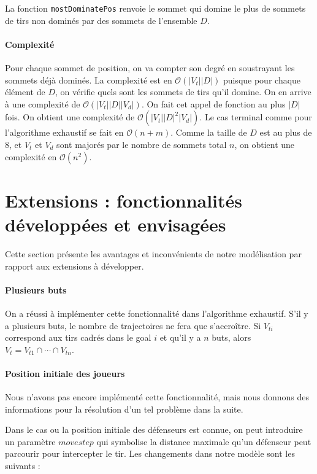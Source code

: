 \documentclass[12pt]{article}
\begin{document}
La fonction \texttt{mostDominatePos} renvoie le sommet qui domine le plus de sommets de tirs non dominés par des sommets de l'ensemble $D$.

\paragraph{Complexité} Pour chaque sommet de position, on va compter son degré en soustrayant les sommets déjà dominés. La complexité est en $\mathcal{O}(|V_t||D|)$ puisque pour chaque élément de $D$, on vérifie quels sont les sommets de tirs qu'il domine. On en arrive à une complexité de $\mathcal{O}(|V_t||D||V_d|)$. On fait cet appel de fonction au plus $|D|$ fois. On obtient une complexité de $\mathcal{O}(|V_t||D|^2|V_d|)$. Le cas terminal comme pour l'algorithme exhaustif se fait en $\mathcal{O}(n+m)$. Comme la taille de $D$ est au plus de 8, et $V_t$ et $V_d$ sont majorés par le nombre de sommets total $n$, on obtient une complexité en $\mathcal{O}(n^2)$.

\section{Extensions : fonctionnalités développées et envisagées}

Cette section présente les avantages et inconvénients de notre modélisation par rapport aux extensions à développer.

\paragraph{Plusieurs buts}
On a réussi à implémenter cette fonctionnalité dans l'algorithme exhaustif. S'il y a plusieurs buts, le nombre de trajectoires ne fera que s'accroître. Si $V_{ti}$ correspond aux tirs cadrés dans le goal $i$ et qu'il y a $n$ buts, alors $V_t = V_{t1} \cap \cdots \cap V_{tn}$.


\paragraph{Position initiale des joueurs} Nous n'avons pas encore implémenté cette fonctionnalité, mais nous donnons des informations pour la résolution d'un tel problème dans la suite.

Dans le cas ou la position initiale des défenseurs est connue, on peut introduire un paramètre $movestep$ qui symbolise la distance maximale qu'un défenseur peut parcourir pour intercepter le tir. Les changements dans notre modèle sont les suivants :
\end{document}
